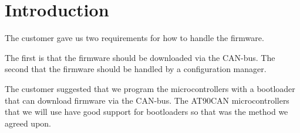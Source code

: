 \section{Introduction}\label{sec:introduction}
The customer gave us two requirements for how to handle the firmware.

The first is that the firmware should be downloaded via the CAN-bus. The second that the firmware should be handled by a configuration manager.

The customer suggested that we program the microcontrollers with a bootloader that can download firmware via the CAN-bus. The AT90CAN microcontrollers that we will use have good support for bootloaders so that was the method we agreed upon.


